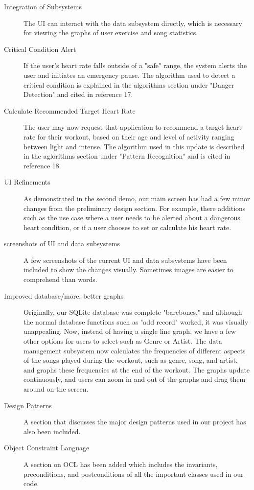 \documentclass[letterpaper,english, 12pt]{scrreprt}
\begin{document}
\begin{description}
	\item[Integration of Subsystems] The UI can interact with the data subsystem directly, which is necessary for viewing the graphs of user exercise and song statistics.
	\item[Critical Condition Alert] If the user's heart rate falls outside of a "safe" range, the system alerts the user and initiates an emergency pause. The algorithm used to detect a critical condition is explained in the algorithms section under "Danger Detection" and cited in reference 17.
	\item[Calculate Recommended Target Heart Rate] The user may now request that application to recommend a target heart rate for their workout, based on their age and level of activity ranging between light and intense. The algorithm used in this update is described in the aglorithms section under "Pattern Recognition" and is cited in reference 18.
	\item[UI Refinements]  As demonstrated in the second demo, our main screen has had a few minor changes from the preliminary design section. For example, there additions such as the use case where a user needs to be alerted about a dangerous heart condition, or if a user chooses to set or calculate his heart rate.
	\item[screenshots of UI and data subsystems] A few screenshots of the current UI and data subsystems have been included to show the changes visually. Sometimes images are easier to comprehend than words.
	\item[Improved database/more, better graphs] Originally, our SQLite database was complete "barebones," and although the normal database functions such as "add record" worked, it was visually unappealing. Now, instead of having a single line graph, we have a few other options for users to select such as Genre or Artist. The data management subsystem now calculates the frequencies of different aspects of the songs played during the workout, such as genre, song, and artist, and graphs these frequencies at the end of the workout. The graphs update continuously, and users can zoom in and out of the graphs and drag them around on the screen.
	\item[Design Patterns] A section that discusses the major design patterns used in our project has also been included.
	\item[Object Constraint Language] A section on OCL has been added which includes the invariants, preconditions, and postconditions of all the important classes used in our code.

\end{description}
\end{document}
